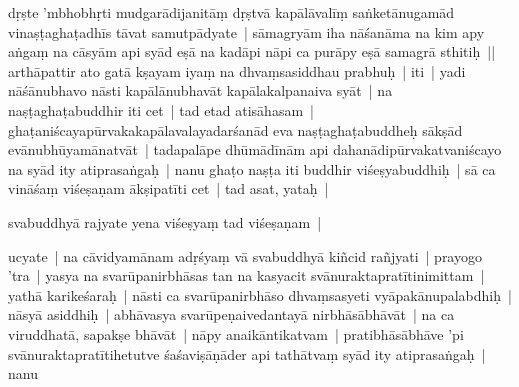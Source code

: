 \documentclass[article,12pt,a4paper]{memoir}%
\newcounter{parCount}
\begin{document}
	  
	  \pstart \leavevmode%
	dṛṣte 'mbhobhṛti mudgarādijanitāṃ dṛṣtvā kapālāvalīṃ saṅketānugamād vinaṣṭaghaṭadhīs tāvat samutpādyate | sāmagryām iha nāśanāma na kim apy aṅgaṃ na cāsyām api syād eṣā na kadāpi nāpi ca purāpy eṣā samagrā sthitiḥ || arthāpattir ato gatā kṣayam iyaṃ na dhvaṃsasiddhau prabhuḥ | iti |  \label{thakur75-120.4} yadi nāśānubhavo nāsti kapālānubhavāt kapālakalpanaiva syāt | na naṣṭaghaṭabuddhir iti cet | \label{thakur75-120.5} tad etad atisāhasam | ghaṭaniścayapūrvakakapālavalayadarśanād eva naṣṭaghaṭabuddheḥ sākṣād evānubhūyamānatvāt | tadapalāpe dhūmādīnām api dahanādipūrvakatvaniścayo na syād ity atiprasaṅgaḥ | \label{thakur75-120.8} nanu ghaṭo naṣṭa iti buddhir viśeṣyabuddhiḥ | sā ca vināśaṃ viśeṣaṇam ākṣipatīti cet | \label{thakur75-120.9} tad asat, yataḥ |
	{}
	\pend%
      

	  
	  \pstart \leavevmode%
	svabuddhyā rajyate yena viśeṣyaṃ tad viśeṣaṇam | 
	{}
	\pend%
      

	  
	  \pstart \leavevmode%
	ucyate | na cāvidyamānam adṛśyaṃ vā svabuddhyā kiñcid rañjyati | \label{thakur75-120.11} prayogo 'tra | yasya na svarūpanirbhāsas tan na kasyacit svānuraktapratītinimittam | yathā karikeśaraḥ | nāsti ca svarūpanirbhāso dhvaṃsasyeti vyāpakānupalabdhiḥ | nāsyā asiddhiḥ | abhāvasya svarūpeṇaivedantayā nirbhāsābhāvāt | na ca viruddhatā, sapakṣe bhāvāt | nāpy anaikāntikatvam | pratibhāsābhāve 'pi svānuraktapratītihetutve śaśaviṣāṇāder api tathātvaṃ syād ity atiprasaṅgaḥ | \label{thakur75-120.17} nanu
	{}
	\pend%
      
\end{document}
